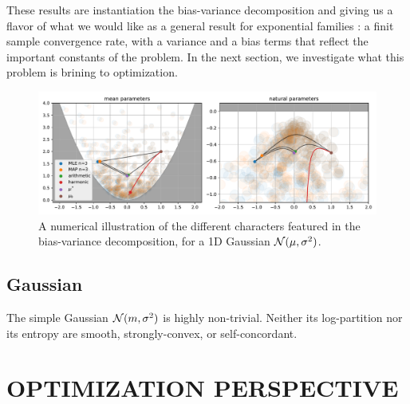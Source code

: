 \documentclass[twoside]{article}
\let\oldsection\section
\renewcommand{\section}[1]{\oldsection{\texorpdfstring{\uppercase{#1}}{#1}}}
\begin{document}
These results are instantiation the bias-variance decomposition and giving us a flavor of what we would like as a general result for exponential families : a finit sample convergence rate, with a variance and a bias terms that reflect the important constants of the problem.
In the next section, we investigate what this problem is brining to optimization.

\begin{figure}[t]
	\centering
	\includegraphics[width=\textwidth]{figs/thales/numerical_schema_n=3.pdf}
	\caption{A numerical illustration of the different characters featured in the bias-variance decomposition, for a 1D Gaussian ${\mathcal N}(\mu, \sigma^2)$.}
	\label{fig:bias-variance-numerical}
\end{figure}

\subsection{Gaussian}
\label{ssec:gaussian}
The simple Gaussian ${\mathcal N}(m,\sigma^2)$ is highly non-trivial. Neither its log-partition nor its entropy are smooth, strongly-convex, or self-concordant.

\section{Optimization Perspective}
\label{sec:optimization}
\end{document}
